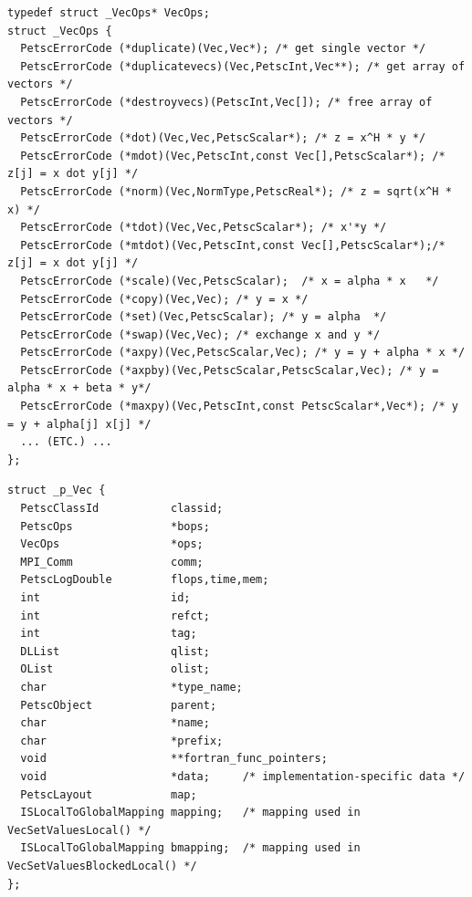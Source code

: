 \begin{lstlisting}[caption=Function table common to all PETSc compatible vector objects (truncated)]
typedef struct _VecOps* VecOps;
struct _VecOps {
  PetscErrorCode (*duplicate)(Vec,Vec*); /* get single vector */
  PetscErrorCode (*duplicatevecs)(Vec,PetscInt,Vec**); /* get array of vectors */
  PetscErrorCode (*destroyvecs)(PetscInt,Vec[]); /* free array of vectors */
  PetscErrorCode (*dot)(Vec,Vec,PetscScalar*); /* z = x^H * y */
  PetscErrorCode (*mdot)(Vec,PetscInt,const Vec[],PetscScalar*); /* z[j] = x dot y[j] */
  PetscErrorCode (*norm)(Vec,NormType,PetscReal*); /* z = sqrt(x^H * x) */
  PetscErrorCode (*tdot)(Vec,Vec,PetscScalar*); /* x'*y */
  PetscErrorCode (*mtdot)(Vec,PetscInt,const Vec[],PetscScalar*);/* z[j] = x dot y[j] */
  PetscErrorCode (*scale)(Vec,PetscScalar);  /* x = alpha * x   */
  PetscErrorCode (*copy)(Vec,Vec); /* y = x */
  PetscErrorCode (*set)(Vec,PetscScalar); /* y = alpha  */
  PetscErrorCode (*swap)(Vec,Vec); /* exchange x and y */
  PetscErrorCode (*axpy)(Vec,PetscScalar,Vec); /* y = y + alpha * x */
  PetscErrorCode (*axpby)(Vec,PetscScalar,PetscScalar,Vec); /* y = alpha * x + beta * y*/
  PetscErrorCode (*maxpy)(Vec,PetscInt,const PetscScalar*,Vec*); /* y = y + alpha[j] x[j] */
  ... (ETC.) ...
};
\end{lstlisting}
\begin{lstlisting}[caption= Data structure header common to all PETSc vector classes]
struct _p_Vec {
  PetscClassId           classid;
  PetscOps               *bops;
  VecOps                 *ops;
  MPI_Comm               comm;
  PetscLogDouble         flops,time,mem;
  int                    id;
  int                    refct;
  int                    tag;
  DLList                 qlist;
  OList                  olist;
  char                   *type_name;
  PetscObject            parent;
  char                   *name;
  char                   *prefix;
  void                   **fortran_func_pointers;
  void                   *data;     /* implementation-specific data */
  PetscLayout            map;
  ISLocalToGlobalMapping mapping;   /* mapping used in VecSetValuesLocal() */
  ISLocalToGlobalMapping bmapping;  /* mapping used in VecSetValuesBlockedLocal() */
};
\end{lstlisting}

